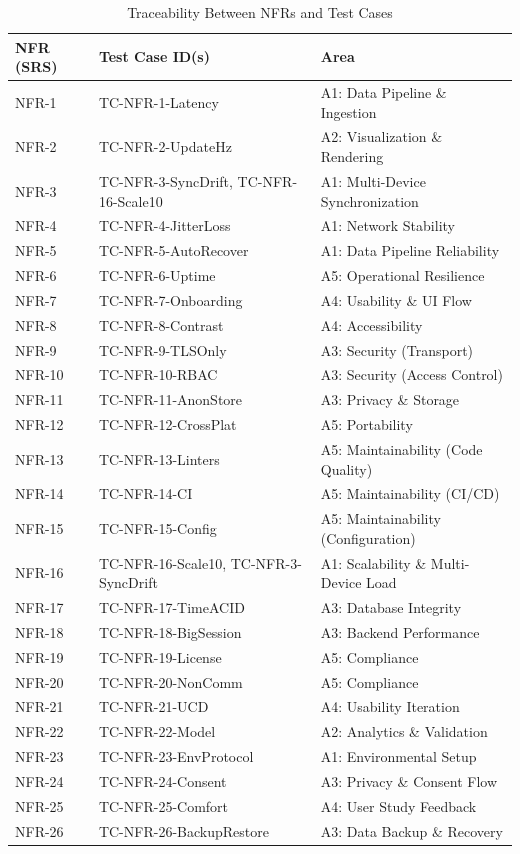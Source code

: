 \documentclass[12pt, titlepage]{article}
\begin{document}
\begin{table}[htbp]
\centering
\caption{Traceability Between NFRs and Test Cases}
\renewcommand{\arraystretch}{1.1}
\small
\begin{tabular}{p{2cm} p{4cm} p{7cm}}
\hline
\textbf{NFR (SRS)} & \textbf{Test Case ID(s)} & \textbf{Area} \\
\hline
NFR-1 & TC-NFR-1-Latency & A1: Data Pipeline \& Ingestion \\
NFR-2 & TC-NFR-2-UpdateHz & A2: Visualization \& Rendering \\
NFR-3 & TC-NFR-3-SyncDrift, TC-NFR-16-Scale10 & A1: Multi-Device Synchronization \\
NFR-4 & TC-NFR-4-JitterLoss & A1: Network Stability \\
NFR-5 & TC-NFR-5-AutoRecover & A1: Data Pipeline Reliability \\
NFR-6 & TC-NFR-6-Uptime & A5: Operational Resilience \\
NFR-7 & TC-NFR-7-Onboarding & A4: Usability \& UI Flow \\
NFR-8 & TC-NFR-8-Contrast & A4: Accessibility \\
NFR-9 & TC-NFR-9-TLSOnly & A3: Security (Transport) \\
NFR-10 & TC-NFR-10-RBAC & A3: Security (Access Control) \\
NFR-11 & TC-NFR-11-AnonStore & A3: Privacy \& Storage \\
NFR-12 & TC-NFR-12-CrossPlat & A5: Portability \\
NFR-13 & TC-NFR-13-Linters & A5: Maintainability (Code Quality) \\
NFR-14 & TC-NFR-14-CI & A5: Maintainability (CI/CD) \\
NFR-15 & TC-NFR-15-Config & A5: Maintainability (Configuration) \\
NFR-16 & TC-NFR-16-Scale10, TC-NFR-3-SyncDrift & A1: Scalability \& Multi-Device Load \\
NFR-17 & TC-NFR-17-TimeACID & A3: Database Integrity \\
NFR-18 & TC-NFR-18-BigSession & A3: Backend Performance \\
NFR-19 & TC-NFR-19-License & A5: Compliance \\
NFR-20 & TC-NFR-20-NonComm & A5: Compliance \\
NFR-21 & TC-NFR-21-UCD & A4: Usability Iteration \\
NFR-22 & TC-NFR-22-Model & A2: Analytics \& Validation \\
NFR-23 & TC-NFR-23-EnvProtocol & A1: Environmental Setup \\
NFR-24 & TC-NFR-24-Consent & A3: Privacy \& Consent Flow \\
NFR-25 & TC-NFR-25-Comfort & A4: User Study Feedback \\
NFR-26 & TC-NFR-26-BackupRestore & A3: Data Backup \& Recovery \\
\hline
\end{tabular}
\end{table}
\end{document}
